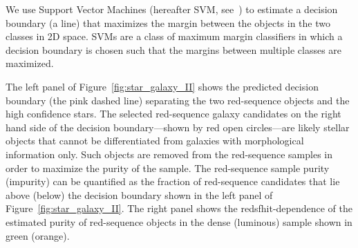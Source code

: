 \documentclass{aa}
\numberwithin{equation}{section}
\begin{document}
{We use Support Vector Machines (hereafter SVM, see~\citealt{cortes1995, cristianini2000, scholkopf2000}) to estimate a decision boundary (a line) that maximizes the margin between the objects in the two classes in 2D space. SVMs are a class of maximum margin classifiers in which a decision boundary is chosen such that the margins between multiple classes are maximized.

The left panel of Figure~\ref{fig:star_galaxy_II} shows the predicted decision boundary (the pink dashed line) separating the two red-sequence objects and the high confidence stars. The selected red-sequence galaxy candidates on the right hand side of the decision boundary---shown by red open circles---are likely stellar objects that cannot be differentiated from galaxies with morphological information only. Such objects are removed from the red-sequence samples in order to maximize the purity of the sample. The red-sequence sample purity (impurity) can be quantified as the fraction of red-sequence candidates that lie above (below) the decision boundary shown in the left panel of Figure~\ref{fig:star_galaxy_II}. The right panel shows the redsfhit-dependence of the estimated purity of red-sequence objects in the dense (luminous) sample shown in green (orange).

}
\end{document}
